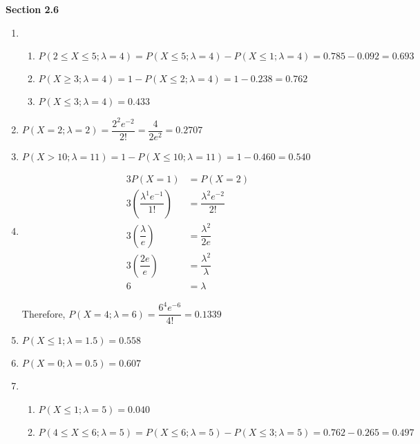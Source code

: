\documentclass{article}
\begin{document}
    \textbf{Section 2.6}
    \begin{enumerate}
     \item 
      \begin{enumerate}
       \item 
	$P(2 \le X \le 5;\lambda=4) = P(X \le 5;\lambda=4) - P(X \le 1;\lambda=4) = 0.785 - 0.092 = 0.693$
       \item
	$P(X \ge 3;\lambda=4) = 1 - P(X \le 2;\lambda=4) = 1 - 0.238 = 0.762$
       
       \item
	$P(X \le 3;\lambda=4) = 0.433$	
      \end{enumerate}
     
     \item
      $P(X=2;\lambda=2) = \dfrac{2^2e^{-2}}{2!} = \dfrac{4}{2e^2} = 0.2707$
     
     \item
      $P(X > 10; \lambda=11) = 1 - P(X \le 10; \lambda=11) = 1 - 0.460 = 0.540$
     
     \item
      \begin{align*}
       3P(X=1) &= P(X=2) \\
       3\left(\dfrac{\lambda^1 e^{-1}}{1!}\right) &= \dfrac{\lambda^2 e^{-2}}{2!} \\
       3\left(\dfrac{\lambda}{e}\right) &= \dfrac{\lambda^2}{2e} \\
       3\left(\dfrac{2e}{e}\right) &= \dfrac{\lambda^2}{\lambda} \\
       6 &= \lambda
      \end{align*}

      Therefore, $P(X=4;\lambda=6) = \dfrac{6^4e^{-6}}{4!} = 0.1339$
     
     \item
      $P(X \le 1;\lambda=1.5) = 0.558$
     
     \item
      $P(X = 0;\lambda=0.5) = 0.607$
     \addtocounter{enumi}{1}
     
     \item
      \begin{enumerate}
       \item
	$P(X \le 1;\lambda=5) = 0.040$
       
       \item
	$P(4 \le X \le 6;\lambda=5) = P(X \le 6; \lambda=5) - P(X \le 3;\lambda=5) = 0.762 - 0.265 = 0.497$
      \end{enumerate}
     

\end{enumerate}
\end{document}
